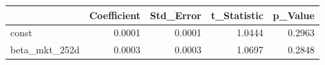 \begin{tabular}{lrrrr}
\toprule
 & Coefficient & Std\_Error & t\_Statistic & p\_Value \\
\midrule
const & 0.0001 & 0.0001 & 1.0444 & 0.2963 \\
beta\_mkt\_252d & 0.0003 & 0.0003 & 1.0697 & 0.2848 \\
\bottomrule
\end{tabular}

